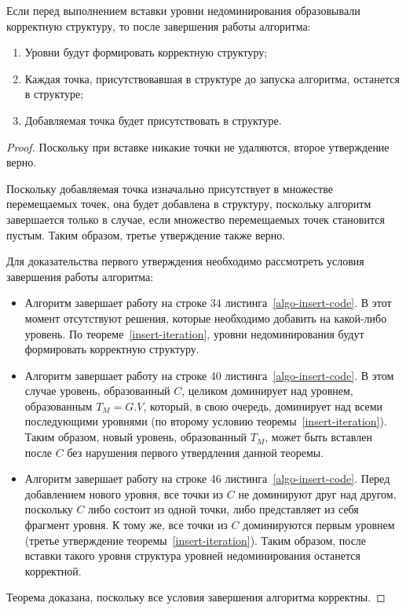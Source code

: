 \begin{theorem}
Если перед выполнением вставки уровни недоминирования образовывали корректную структуру, то 
после завершения работы алгоритма:
\begin{enumerate}
    \item Уровни будут формировать корректную структуру;
    \item Каждая точка, присутствовавшая в структуре до запуска алгоритма,
	      останется в структуре;
    \item Добавляемая точка будет присутствовать в структуре.
\end{enumerate}
\end{theorem}
\begin{proof}
Поскольку при вставке никакие точки не удаляются, второе утверждение верно.

Поскольку добавляемая точка изначально присутствует в множестве перемещаемых точек, она будет 
добавлена в структуру, поскольку алгоритм завершается только в случае, если множество перемещаемых 
точек становится пустым. Таким образом, третье утверждение также верно.

Для доказательства первого утверждения необходимо рассмотреть условия завершения работы алгоритма:
\begin{itemize}
    \item Алгоритм завершает работу на строке 34 листинга~\ref{algo-insert-code}.
          В этот момент отсутствуют решения, которые необходимо добавить на какой-либо уровень.
          По теореме~\ref{insert-iteration}, уровни недоминирования будут формировать корректную
		  структуру.
    \item Алгоритм завершает работу на строке 40 листинга~\ref{algo-insert-code}.
          В этом случае уровень, образованный $C$, целиком доминирует над уровнем, 
		  образованным $T_M = G.V$, который, в свою очередь, доминирует над всеми последующими уровнями
		  (по второму условию теоремы~\ref{insert-iteration}).
		  Таким образом, новый уровень, образованный $T_M$, может быть вставлен после $C$ 
		  без нарушения первого утвердления данной теоремы.
    \item Алгоритм завершает работу на строке 46 листинга~\ref{algo-insert-code}. Перед добавлением
		  нового уровня, все точки из $C$ не доминируют друг над другом, поскольку $C$ либо
          состоит из одной точки, либо представляет из себя фрагмент уровня. К тому же, все точки из $C$
		  доминируются первым уровнем (третье утверждение теоремы~\ref{insert-iteration}).
		  Таким образом, после вставки такого уровня структура уровней недоминирования останется
		  корректной.
\end{itemize}
Теорема доказана, поскольку все условия завершения алгоритма корректны.
\end{proof}


